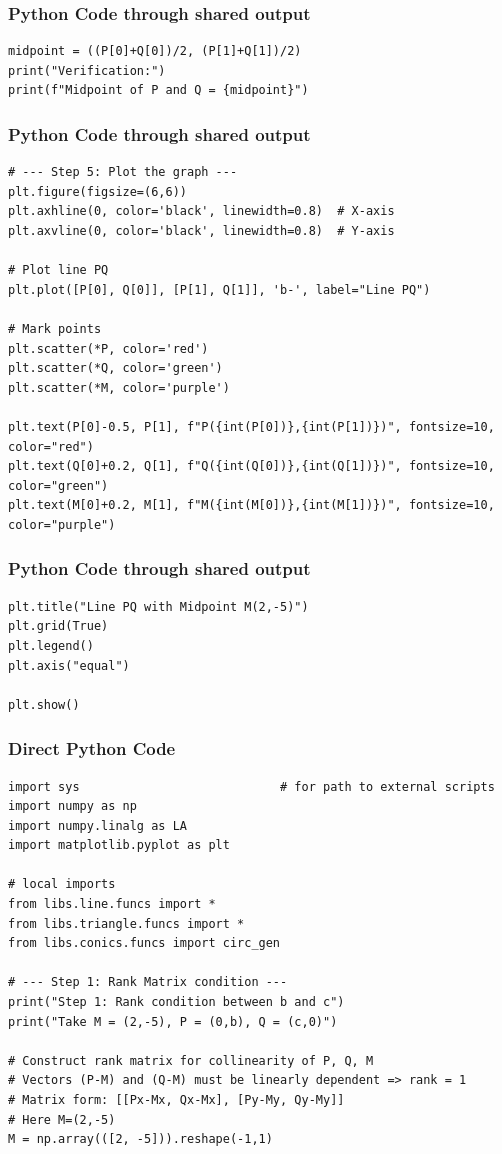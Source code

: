 \documentclass{beamer}
\begin{document}
\begin{frame}[fragile]\frametitle{Python Code through shared output}
\begin{lstlisting}
midpoint = ((P[0]+Q[0])/2, (P[1]+Q[1])/2)
print("Verification:")
print(f"Midpoint of P and Q = {midpoint}")
\end{lstlisting}
\end{frame}
\begin{frame}[fragile]\frametitle{Python Code through shared output}
\begin{lstlisting}
# --- Step 5: Plot the graph ---
plt.figure(figsize=(6,6))
plt.axhline(0, color='black', linewidth=0.8)  # X-axis
plt.axvline(0, color='black', linewidth=0.8)  # Y-axis

# Plot line PQ
plt.plot([P[0], Q[0]], [P[1], Q[1]], 'b-', label="Line PQ")

# Mark points
plt.scatter(*P, color='red')
plt.scatter(*Q, color='green')
plt.scatter(*M, color='purple')

plt.text(P[0]-0.5, P[1], f"P({int(P[0])},{int(P[1])})", fontsize=10, color="red")
plt.text(Q[0]+0.2, Q[1], f"Q({int(Q[0])},{int(Q[1])})", fontsize=10, color="green")
plt.text(M[0]+0.2, M[1], f"M({int(M[0])},{int(M[1])})", fontsize=10, color="purple")
\end{lstlisting}
\end{frame}
\begin{frame}[fragile]\frametitle{Python Code through shared output}
\begin{lstlisting}
plt.title("Line PQ with Midpoint M(2,-5)")
plt.grid(True)
plt.legend()
plt.axis("equal")

plt.show()
\end{lstlisting}
\end{frame}
\begin{frame}[fragile]
	\frametitle{Direct Python Code}
	\begin{lstlisting}
import sys                            # for path to external scripts
import numpy as np
import numpy.linalg as LA
import matplotlib.pyplot as plt

# local imports
from libs.line.funcs import *
from libs.triangle.funcs import *
from libs.conics.funcs import circ_gen

# --- Step 1: Rank Matrix condition ---
print("Step 1: Rank condition between b and c")
print("Take M = (2,-5), P = (0,b), Q = (c,0)")

# Construct rank matrix for collinearity of P, Q, M
# Vectors (P-M) and (Q-M) must be linearly dependent => rank = 1
# Matrix form: [[Px-Mx, Qx-Mx], [Py-My, Qy-My]]
# Here M=(2,-5)
M = np.array(([2, -5])).reshape(-1,1)
\end{lstlisting}
\end{frame}
\end{document}
